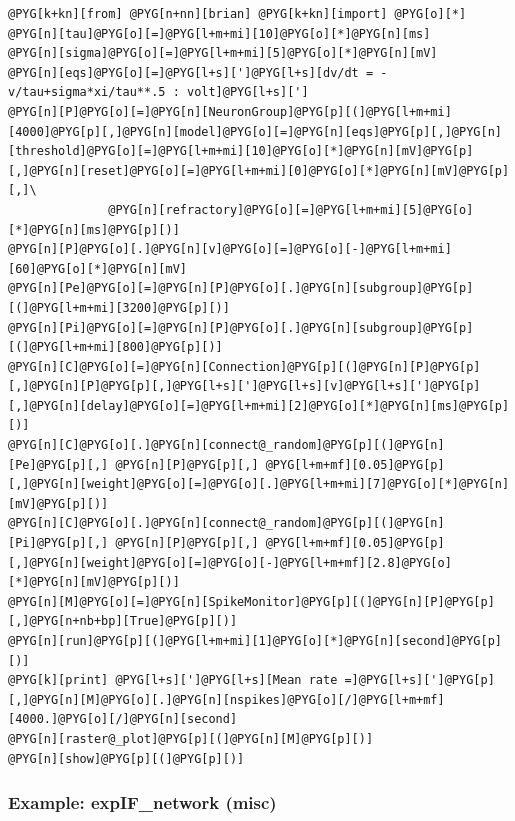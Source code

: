 \documentclass[letterpaper,10pt,english]{manual}
\begin{document}
\begin{Verbatim}[commandchars=@\[\]]
@PYG[k+kn][from] @PYG[n+nn][brian] @PYG[k+kn][import] @PYG[o][*]
@PYG[n][tau]@PYG[o][=]@PYG[l+m+mi][10]@PYG[o][*]@PYG[n][ms]
@PYG[n][sigma]@PYG[o][=]@PYG[l+m+mi][5]@PYG[o][*]@PYG[n][mV]
@PYG[n][eqs]@PYG[o][=]@PYG[l+s][']@PYG[l+s][dv/dt = -v/tau+sigma*xi/tau**.5 : volt]@PYG[l+s][']
@PYG[n][P]@PYG[o][=]@PYG[n][NeuronGroup]@PYG[p][(]@PYG[l+m+mi][4000]@PYG[p][,]@PYG[n][model]@PYG[o][=]@PYG[n][eqs]@PYG[p][,]@PYG[n][threshold]@PYG[o][=]@PYG[l+m+mi][10]@PYG[o][*]@PYG[n][mV]@PYG[p][,]@PYG[n][reset]@PYG[o][=]@PYG[l+m+mi][0]@PYG[o][*]@PYG[n][mV]@PYG[p][,]\
              @PYG[n][refractory]@PYG[o][=]@PYG[l+m+mi][5]@PYG[o][*]@PYG[n][ms]@PYG[p][)]
@PYG[n][P]@PYG[o][.]@PYG[n][v]@PYG[o][=]@PYG[o][-]@PYG[l+m+mi][60]@PYG[o][*]@PYG[n][mV]
@PYG[n][Pe]@PYG[o][=]@PYG[n][P]@PYG[o][.]@PYG[n][subgroup]@PYG[p][(]@PYG[l+m+mi][3200]@PYG[p][)]
@PYG[n][Pi]@PYG[o][=]@PYG[n][P]@PYG[o][.]@PYG[n][subgroup]@PYG[p][(]@PYG[l+m+mi][800]@PYG[p][)]
@PYG[n][C]@PYG[o][=]@PYG[n][Connection]@PYG[p][(]@PYG[n][P]@PYG[p][,]@PYG[n][P]@PYG[p][,]@PYG[l+s][']@PYG[l+s][v]@PYG[l+s][']@PYG[p][,]@PYG[n][delay]@PYG[o][=]@PYG[l+m+mi][2]@PYG[o][*]@PYG[n][ms]@PYG[p][)]
@PYG[n][C]@PYG[o][.]@PYG[n][connect@_random]@PYG[p][(]@PYG[n][Pe]@PYG[p][,] @PYG[n][P]@PYG[p][,] @PYG[l+m+mf][0.05]@PYG[p][,]@PYG[n][weight]@PYG[o][=]@PYG[o][.]@PYG[l+m+mi][7]@PYG[o][*]@PYG[n][mV]@PYG[p][)]
@PYG[n][C]@PYG[o][.]@PYG[n][connect@_random]@PYG[p][(]@PYG[n][Pi]@PYG[p][,] @PYG[n][P]@PYG[p][,] @PYG[l+m+mf][0.05]@PYG[p][,]@PYG[n][weight]@PYG[o][=]@PYG[o][-]@PYG[l+m+mf][2.8]@PYG[o][*]@PYG[n][mV]@PYG[p][)]
@PYG[n][M]@PYG[o][=]@PYG[n][SpikeMonitor]@PYG[p][(]@PYG[n][P]@PYG[p][,]@PYG[n+nb+bp][True]@PYG[p][)]
@PYG[n][run]@PYG[p][(]@PYG[l+m+mi][1]@PYG[o][*]@PYG[n][second]@PYG[p][)]
@PYG[k][print] @PYG[l+s][']@PYG[l+s][Mean rate =]@PYG[l+s][']@PYG[p][,]@PYG[n][M]@PYG[o][.]@PYG[n][nspikes]@PYG[o][/]@PYG[l+m+mf][4000.]@PYG[o][/]@PYG[n][second]
@PYG[n][raster@_plot]@PYG[p][(]@PYG[n][M]@PYG[p][)]
@PYG[n][show]@PYG[p][(]@PYG[p][)]
\end{Verbatim}

\resetcurrentobjects
\hypertarget{--doc-examples-misc_expIF_network}{}

\hypertarget{index-45}{}\subsubsection{Example: expIF\_network (misc)}
\end{document}
